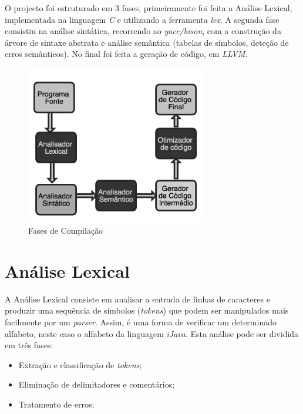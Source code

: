 \documentclass[12pt]{article}
\begin{document}
O projecto foi estruturado em 3 fases, primeiramente foi feita a Análise Lexical, implementada na linguagem \emph{C} e utilizando a ferramenta \emph{lex}. A segunda fase consistiu na análise sintática, recorrendo ao \emph{yacc/bison}, com a  construção da árvore de sintaxe abstrata e análise semântica (tabelas de símbolos, deteção de erros semânticos). No final foi feita a geração de código, em \emph{LLVM}.

\begin{figure}[H]
       \centering
       \includegraphics[keepaspectratio=true, width=300px]{fasesCompilacao.png}
       \caption{Fases de Compilação}
       \end{figure}

\pagebreak
\section{Análise Lexical}

A Análise Lexical consiste em analisar a entrada de linhas de caracteres e produzir uma sequência de símbolos (\emph{tokens}) que podem ser manipulados mais facilmente por um \emph{parser}. Assim, é uma forma de verificar um determinado alfabeto, neste caso o alfabeto da linguagem \emph{iJava}.
Esta análise pode ser dividida em três fases:
\begin{itemize}
	\item Extração e classificação de \emph{tokens};
	\item Eliminação de delimitadores e comentários;
	\item Tratamento de erros;
\end{itemize}
\end{document}
